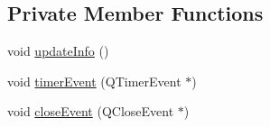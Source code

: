 \subsection*{Private Member Functions}
\begin{DoxyCompactItemize}
\item 
void \hyperlink{classFishInfoView_ae789978f20407aed46458af8f3c07aae_ae789978f20407aed46458af8f3c07aae}{update\+Info} ()
\item 
void \hyperlink{classFishInfoView_a5125ab4e284469e0e13438967a6ddfd8_a5125ab4e284469e0e13438967a6ddfd8}{timer\+Event} (Q\+Timer\+Event $\ast$)
\item 
void \hyperlink{classFishInfoView_a0c243d1c712f98879dd6a7f547f30ad0_a0c243d1c712f98879dd6a7f547f30ad0}{close\+Event} (Q\+Close\+Event $\ast$)
\end{DoxyCompactItemize}
